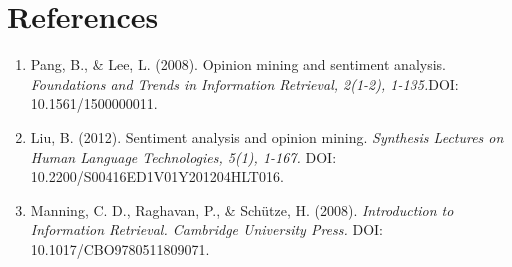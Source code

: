 \chapter{References}
\begin{enumerate}
    \item Pang, B., & Lee, L. (2008). Opinion mining and sentiment analysis. \textit {Foundations and Trends in Information Retrieval, 2(1-2), 1-135.}DOI: 10.1561/1500000011.
    \item Liu, B. (2012). Sentiment analysis and opinion mining. \textit{Synthesis Lectures on Human Language Technologies, 5(1), 1-167.} DOI: 10.2200/S00416ED1V01Y201204HLT016.
    \item Manning, C. D., Raghavan, P., & Schütze, H. (2008). \textit{Introduction to Information Retrieval. Cambridge University Press.} DOI: 10.1017/CBO9780511809071.
    

\end{enumerate}
